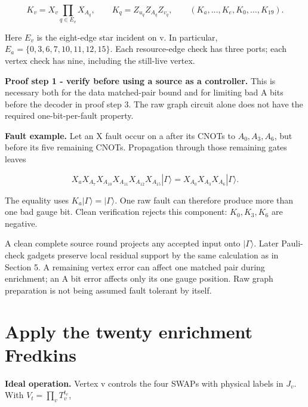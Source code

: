 \documentclass[11pt]{article}
\begin{document}
\[
K_v=X_v\prod_{q\in E_v}X_{A_q},\qquad
K_q=Z_{u_q}Z_{A_q}Z_{v_q},\qquad
(K_a,\ldots,K_e,K_0,\ldots,K_{19}).
\]

Here \(E_v\) is the eight-edge star incident on v. In particular, \(E_a=\{0,3,6,7,10,11,12,15\}\). Each resource-edge check has three ports; each vertex check has nine, including the still-live vertex.

\begin{center}\begin{minipage}{\linewidth}

\end{minipage}\end{center}

\begin{center}\begin{minipage}{\linewidth}

\end{minipage}\end{center}

\textbf{Proof step 1 - verify before using a source as a controller.} This is necessary both for the data matched-pair bound and for limiting bad A bits before the decoder in proof step 3. The raw graph circuit alone does not have the required one-bit-per-fault property.

\textbf{Fault example.} Let an X fault occur on a after its CNOTs to \(A_0,A_3,A_6\), but before its five remaining CNOTs. Propagation through those remaining gates leaves

\[
X_aX_{A_7}X_{A_{10}}X_{A_{11}}X_{A_{12}}X_{A_{15}}|\Gamma\rangle
=X_{A_0}X_{A_3}X_{A_6}|\Gamma\rangle.
\]

The equality uses \(K_a|\Gamma\rangle=|\Gamma\rangle\). One raw fault can therefore produce more than one bad gauge bit. Clean verification rejects this component: \(K_0,K_3,K_6\) are negative.

A clean complete source round projects any accepted input onto \(|\Gamma\rangle\). Later Pauli-check gadgets preserve local residual support by the same calculation as in Section 5. A remaining vertex error can affect one matched pair during enrichment; an A bit error affects only its one gauge position. Raw graph preparation is not being assumed fault tolerant by itself.

\section{Apply the twenty enrichment Fredkins}
\textbf{Ideal operation.} Vertex v controls the four SWAPs with physical labels in \(J_v\). With \(V_t=\prod_vT_v^{t_v}\),
\end{document}
